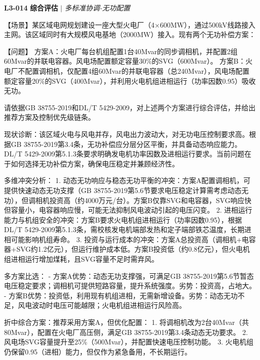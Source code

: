 \documentclass[11pt,a4paper]{ctexart}
\begin{document}
\noindent\textbf{L3-014} \hfill \textbf{综合评估} $|$ \textit{多标准协调-无功配置}
\begin{description}[leftmargin=1.5em,style=nextline,font=\normalfont]
  \item[Q:] 【场景】某区域电网规划建设一座大型火电厂（4×600MW），通过500kV线路接入主网。该区域同时有大规模风电基地（2000MW）接入。现有两个无功补偿方案：

【问题】
方案A：火电厂每台机组配置1台40Mvar的同步调相机，并配置2组60Mvar的并联电容器。风电场配置额定容量30\%的SVG（600Mvar）。
方案B：火电厂不配置调相机，仅配置4组60Mvar的并联电容器（总240Mvar），风电场配置额定容量20\%的SVG（400Mvar），并利用火电机组进相运行（功率因数0.95）吸收无功。

请依据GB 38755-2019和DL/T 5429-2009，对上述两个方案进行综合评估，并给出推荐方案及控制优先级链条。
  \item[A:] 现状诊断：该区域火电与风电并存，风电出力波动大，对无功电压控制要求高。根据GB 38755-2019第3.4条，无功补偿应分层分区平衡，并具备动态响应能力。DL/T 5429-2009第5.1.3条要求明确发电机功率因数及进相运行要求。当前问题在于如何选择无功补偿方案，确保电压稳定并兼顾经济性。

多维冲突分析：
1. 动态无功响应与稳态无功平衡的冲突：方案A配置调相机，可提供快速动态无功支撑（GB 38755-2019第5.6节要求电压稳定计算需考虑动态无功），但调相机投资高（约4000万元/台）。方案B仅靠SVG和电容器，SVG响应快但容量小，电容器响应慢，可能无法抑制风电波动引起的电压闪变。
2. 进相运行能力与机组安全的冲突：方案B要求火电机组进相运行（功率因数0.95），根据DL/T 5429-2009第5.1.3条，需校核发电机端部发热和定子端部铁芯温度，长期进相可能影响机组寿命。
3. 投资与运行成本的冲突：方案A总投资高（调相机+电容器+SVG约1.2亿元），但运行维护成本低。方案B投资低（约0.8亿元），但火电机组进相运行增加煤耗，且SVG容量不足时需弃风。

多方案比选：
- 方案A优势：动态无功支撑强，可满足GB 38755-2019第5.6节暂态电压稳定要求；调相机可提供短路容量，提升系统强度。劣势：投资高，占地大。
- 方案B优势：投资低，利用现有机组进相，无需新增设备。劣势：动态无功不足，风电波动时电压可能越限；火电机组进相运行风险高。

折中综合方案：推荐采用方案A，但优化配置：
1. 将调相机改为2台40Mvar（共80Mvar），配置在火电厂高压侧，满足GB 38755-2019第3.4条动态无功要求。
2. 风电场SVG容量提升至25\%（500Mvar），并配置快速电压控制功能。
3. 火电机组仍保留0.95（进相）能力，但仅作为紧急备用，不长期运行。


\end{description}
\end{document}
